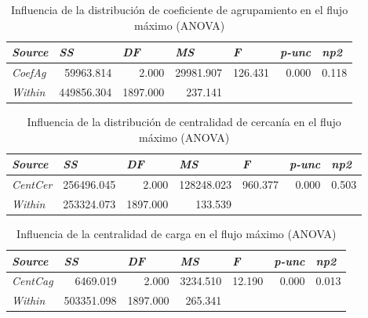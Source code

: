 \documentclass{article}
\begin{document}
\begin{table}[htbp]
  \centering
  \caption{Influencia de la distribución de coeficiente de agrupamiento en el flujo máximo (ANOVA)}
    \begin{tabular}{lrrrrrr}
    \toprule
    \textit{\textbf{Source}} & \multicolumn{1}{l}{\textit{\textbf{SS}}} & \multicolumn{1}{l}{\textit{\textbf{DF}}} & \multicolumn{1}{l}{\textit{\textbf{MS}}} & \multicolumn{1}{l}{\textit{\textbf{F}}} & \multicolumn{1}{l}{\textit{\textbf{p-unc}}} & \multicolumn{1}{l}{\textit{\textbf{np2}}} \\
    \midrule
    \textit{CoefAg} & 59963.814 & 2.000 & 29981.907 & 126.431 & 0.000 & 0.118 \\
    \textit{Within} & 449856.304 & 1897.000 & 237.141 &       &       &  \\
    \bottomrule
    \end{tabular}%
  \label{tab:t22}%
\end{table}%

\begin{table}[htbp]
  \centering
  \caption{Influencia de la distribución de centralidad de cercanía en el flujo máximo (ANOVA)}
    \begin{tabular}{lrrrrrr}
    \toprule
    \textit{\textbf{Source}} & \multicolumn{1}{l}{\textit{\textbf{SS}}} & \multicolumn{1}{l}{\textit{\textbf{DF}}} & \multicolumn{1}{l}{\textit{\textbf{MS}}} & \multicolumn{1}{l}{\textit{\textbf{F}}} & \multicolumn{1}{l}{\textit{\textbf{p-unc}}} & \multicolumn{1}{l}{\textit{\textbf{np2}}} \\
    \midrule
    \textit{CentCer} & 256496.045 & 2.000 & 128248.023 & 960.377 & 0.000 & 0.503 \\
    \textit{Within} & 253324.073 & 1897.000 & 133.539 &       &       &  \\
    \bottomrule
    \end{tabular}%
  \label{tab:t23}%
\end{table}%

\begin{table}[htbp]
  \centering
  \caption{Influencia de la centralidad de carga  en el flujo máximo (ANOVA)}
    \begin{tabular}{lrrrrrr}
    \toprule
    \textit{\textbf{Source}} & \multicolumn{1}{l}{\textit{\textbf{SS}}} & \multicolumn{1}{l}{\textit{\textbf{DF}}} & \multicolumn{1}{l}{\textit{\textbf{MS}}} & \multicolumn{1}{l}{\textit{\textbf{F}}} & \multicolumn{1}{l}{\textit{\textbf{p-unc}}} & \multicolumn{1}{l}{\textit{\textbf{np2}}} \\
    \midrule
    \textit{CentCag} & 6469.019 & 2.000 & 3234.510 & 12.190 & 0.000 & 0.013 \\
    \textit{Within} & 503351.098 & 1897.000 & 265.341 &       &       &  \\
    \bottomrule
    \end{tabular}%
  \label{tab:t24}%
\end{table}%
\end{document}

